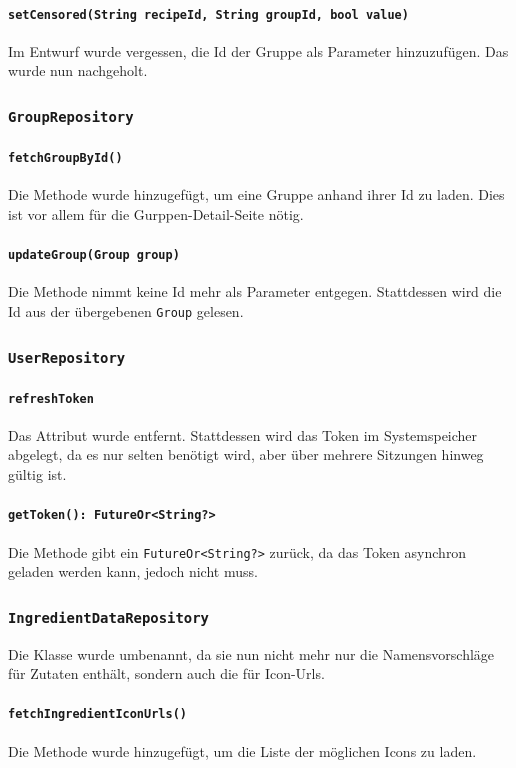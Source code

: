 \documentclass{implementierungsheft}
\begin{document}
\paragraph{\texttt{setCensored(String recipeId, String groupId, bool value)}} Im Entwurf wurde vergessen, die Id der Gruppe als Parameter hinzuzufügen. Das wurde nun nachgeholt.
\subsubsection{\texttt{GroupRepository}}
\paragraph*{\texttt{fetchGroupById()}} Die Methode wurde hinzugefügt, um eine Gruppe anhand ihrer Id zu laden. Dies ist vor allem für die Gurppen-Detail-Seite nötig.
\paragraph*{\texttt{updateGroup(Group group)}} Die Methode nimmt keine Id mehr als Parameter entgegen. Stattdessen wird die Id aus der übergebenen \texttt{Group} gelesen.
\subsubsection{\texttt{UserRepository}}
\paragraph{\texttt{refreshToken}}
Das Attribut wurde entfernt. Stattdessen wird das Token im Systemspeicher abgelegt, da es nur selten benötigt wird, aber über mehrere Sitzungen hinweg gültig ist.
\paragraph{\texttt{getToken(): FutureOr<String?>}} Die Methode gibt ein \texttt{FutureOr<String?>} zurück, da das Token asynchron geladen werden kann, jedoch nicht muss.
\subsubsection{\texttt{IngredientDataRepository}}
Die Klasse wurde umbenannt, da sie nun nicht mehr nur die Namensvorschläge für Zutaten enthält, sondern auch die für Icon-Urls.
\paragraph{\texttt{fetchIngredientIconUrls()}} Die Methode wurde hinzugefügt, um die Liste der möglichen Icons zu laden.
\newpage
\end{document}
